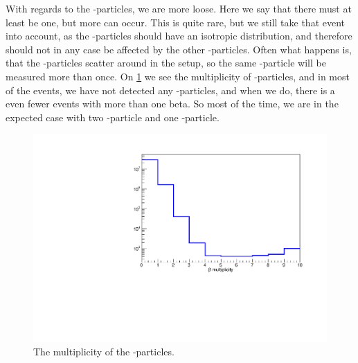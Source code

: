 With regards to the \be-particles, we are more loose. Here we say that there must at least be one, but more can occur. This is quite rare, but we still take that event into account, as the \be-particles should have an isotropic distribution, and therefore should not in any case be affected by the other \al-particles. Often what happens is, that the \be-particles scatter around in the setup, so the same \be-particle will be measured more than once. On \cref{fig:mulBeta} we see the multiplicity of \be-particles, and in most of the events, we have not detected any \be-particles, and when we do, there is a even fewer events with more than one beta. So most of the time, we are in the expected case with two \al-particle and one \be-particle. 


\begin{figure}[h]
	\includegraphics[width=\linewidth]{../figures/betaMul.pdf}
	\caption{The multiplicity of the \be-particles.}
	\label{fig:mulBeta}
\end{figure}